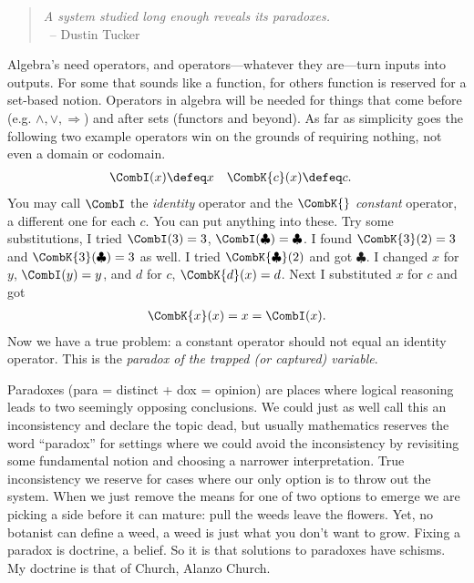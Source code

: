 \begin{quote}
\emph{A system studied long enough reveals its paradoxes.}\\
~\hfill-- Dustin Tucker
\end{quote}
Algebra's need operators, and operators---whatever they are---turn inputs into
outputs.  For some that sounds like a function, for others function is reserved
for a set-based notion.  Operators in algebra will be needed for things that
come before (e.g. $\wedge,\vee,\Rightarrow$) and after sets (functors and beyond). As far as
simplicity goes the following two example operators win on the grounds of
requiring nothing, not even a domain or codomain.
\begin{align*}
    \CombI(x) & \defeq x & 
    \CombK{c}(x) & \defeq c.
\end{align*}
You may call $\CombI$ the \emph{identity} operator and the $\CombK{}$ \emph{constant} operator,
a different one for each $c$.  You can put anything into these.
Try some substitutions, I tried $\CombI(3)=3$, $\CombI(\clubsuit)=\clubsuit$.
I found $\CombK{3}(2)=3$ and $\CombK{3}(\clubsuit)=3$ as well.  I tried 
$\CombK{\clubsuit}(2)$ and got $\clubsuit$.  I changed $x$ for $y$, 
$\CombI(y)=y$, and $d$ for $c$, $\CombK{d}(x)=d$. Next I substituted $x$ for $c$ and got
\begin{align*}
    \CombK{x}(x)=x=\CombI(x).
\end{align*}
Now we have a true problem: a constant operator should not equal 
an identity operator.  This is the \emph{paradox of the trapped (or captured) variable}.

Paradoxes (para = distinct + dox = opinion) are places where logical reasoning
leads to two seemingly opposing conclusions.  We could just as well call this an
inconsistency and declare the topic dead, but usually mathematics reserves the
word ``paradox'' for settings where we could avoid the inconsistency by revisiting
some fundamental notion and choosing a narrower interpretation.  True
inconsistency we reserve for cases where our only option is to throw out the
system.  When we just remove the means for one of two options to 
emerge we are picking a side before it can mature: pull the weeds leave the flowers.
Yet, no botanist can define a weed, a weed is just what you don't want to grow.
Fixing a paradox is doctrine, a belief.  So it 
is that solutions to paradoxes have schisms.  My doctrine is that of Church,
Alanzo Church.\Church
